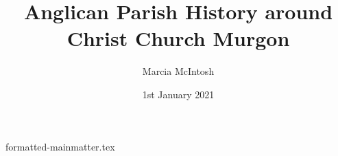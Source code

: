 \documentclass[a4paper,10pt,parskip=half,DIV=calc,chapterprefix=true,titlepage=true]{scrbook}
\title{Anglican Parish History around Christ Church Murgon}
\author{Marcia McIntosh}
\date{1st January 2021}
\begin{document}
\maketitle
\frontmatter

{
\setcounter{tocdepth}{2}
\tableofcontents
}
\mainmatter
\setcounter{page}{1}
{formatted-mainmatter.tex}
\backmatter
\end{document}
